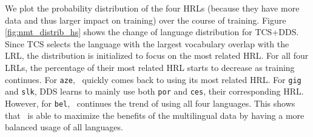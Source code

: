 

We plot the probability distribution of the four HRLs (because they have more data and thus larger impact on training) over the course of training.  Figure \ref{fig:nmt_distrib_hs} shows the change of language distribution for TCS+DDS. Since TCS selects the language with the largest vocabulary overlap with the LRL, the distribution is initialized to focus on the most related HRL. For all four LRLs, the percentage of their most related HRL starts to decrease as training continues. For \texttt{aze}, \dds~quickly comes back to using its most related HRL. For \texttt{gig} and \texttt{slk}, DDS learns to mainly use both \texttt{por} and \texttt{ces}, their corresponding HRL. However, for \texttt{bel}, \dds~continues the trend of using all four languages. This shows that \dds~is able to maximize the benefits of the multilingual data by having a more balanced usage of all languages. 

